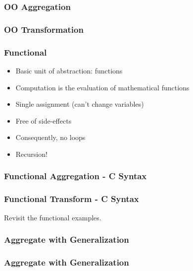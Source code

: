 \begin{frame}[fragile]
  \frametitle{OO Aggregation}

  
\end{frame}

\begin{frame}[fragile]
  \frametitle{OO Transformation}

  
\end{frame}

\begin{frame}
  \frametitle{Functional}

  \begin{itemize}
    \item<1-> Basic unit of abstraction: functions
    \item<2-> Computation is the evaluation of mathematical functions
    \item<3-> Single assignment (can't change variables)
    \item<4-> Free of side-effects
    \item<5-> Consequently, no loops
    \item<6-> Recursion!
  \end{itemize}
\end{frame}

\begin{frame}[fragile]
  \frametitle{Functional Aggregation - C Syntax}

  
\end{frame}

\begin{frame}[fragile]
  \frametitle{Functional Transform - C Syntax}

  
\end{frame}



\begin{frame}
  Revisit the functional examples.
\end{frame}

\begin{frame}[fragile]
  \frametitle{Aggregate with Generalization}

  
\end{frame}

\begin{frame}[fragile]
  \frametitle{Aggregate with Generalization}

  
\end{frame}

